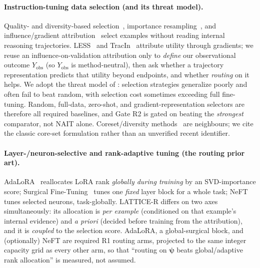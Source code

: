 \documentclass[11pt]{article}
\theoremstyle{definition}
\newcommand{\psivec}{\bm{\psi}}
\begin{document}
\paragraph{Instruction-tuning data selection (and its threat model).}
Quality- and diversity-based selection~\cite{cao2023instruction,zhou2023lima},
importance resampling~\cite{xie2023dsir}, and influence/gradient
attribution~\cite{koh2017influence,pruthi2020tracin,xia2024less} select examples without
reading internal reasoning trajectories. LESS~\cite{xia2024less} and
TracIn~\cite{pruthi2020tracin} attribute utility through gradients; we reuse an
influence-on-validation attribution only to \emph{define} our observational outcome
$Y_{\mathrm{obs}}$ (so $Y_{\mathrm{obs}}$ is method-neutral), then ask whether a
trajectory representation predicts that utility beyond endpoints, and whether \emph{routing}
on it helps. We adopt the threat model of \cite{diddee2024chasing}: selection strategies
generalize poorly and often fail to beat random, with selection cost sometimes exceeding
full fine-tuning. Random, full-data, zero-shot, and gradient-representation selectors are
therefore all required baselines, and Gate R2 is gated on beating the \emph{strongest}
comparator, not NAIT alone. Coreset/diversity methods~\cite{sener2018coreset} are
neighbours; we cite the classic core-set formulation rather than an unverified recent
identifier.

\paragraph{Layer-/neuron-selective and rank-adaptive tuning (the routing prior art).}
AdaLoRA~\cite{zhang2023adalora} reallocates LoRA rank \emph{globally during training} by
an SVD-importance score; Surgical Fine-Tuning~\cite{lee2023surgical} tunes one
\emph{fixed} layer block for a whole task; NeFT~\cite{xu2024neft} tunes selected neurons,
task-globally. LATTICE-R differs on two axes simultaneously: its allocation is
\emph{per example} (conditioned on that example's internal evidence) and \emph{a priori}
(decided before training from the attribution), and it is \emph{coupled} to the selection
score. AdaLoRA, a global-surgical block, and (optionally) NeFT are required R1 routing
arms, projected to the same integer capacity grid as every other arm, so that ``routing
on $\psivec$ beats global/adaptive rank allocation'' is measured, not assumed.
\end{document}
